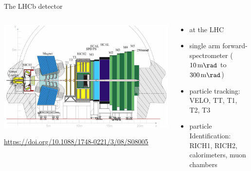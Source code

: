 \documentclass[aspectratio=1610, 10pt]{beamer}
\begin{document}
\begin{frame}{The LHCb detector}
  \begin{columns}
    \begin{column}{0.6\textwidth}
      \includegraphics[width=\textwidth]{images/lhcb_detector.png}

      \small \url{https://doi.org/10.1088/1748-0221/3/08/S08005}
    \end{column}
    \begin{column}{0.4\textwidth}
      \begin{itemize}
        \item at the LHC
        \item single arm forward-spectrometer ($\qty{10}{\milli \rad}$ to $\qty{300}{\milli \rad}$)
        \item particle tracking: VELO, TT, T1, T2, T3
        \item particle Identification: RICH1, RICH2, calorimeters, muon chambers
      \end{itemize}
    \end{column}
  \end{columns}
\end{frame}
\end{document}
